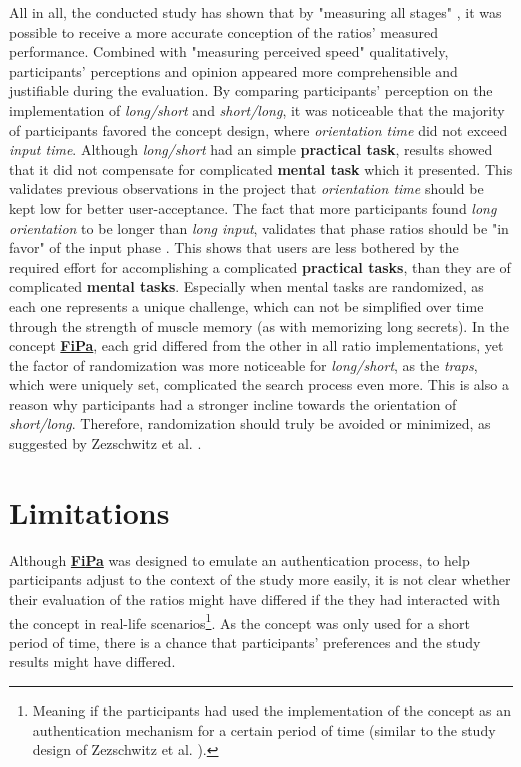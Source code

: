 All in all, the conducted study has shown that by "measuring all stages" \cite{Zezschwitz}, it was possible to receive a more accurate conception of the ratios' measured performance. Combined with "measuring perceived speed" \cite{Zezschwitz} qualitatively, participants' perceptions and opinion appeared more comprehensible and justifiable during the evaluation. By comparing participants' perception on the implementation of \textit{long/short} and \textit{short/long}, it was noticeable that the majority of participants favored the concept design, where \textit{orientation time} did not exceed \textit{input time}. Although \textit{long/short} had an simple \textbf{practical task}, results showed that it did not compensate for complicated \textbf{mental task} which it presented. This validates previous observations in the project that \textit{orientation time} should be kept low for better user-acceptance. The fact that more participants found \textit{long orientation} to be longer than \textit{long input}, validates that phase ratios should be "in favor" of the input phase . This shows that users are less bothered by the required effort for accomplishing a complicated \textbf{practical tasks}, than they are of complicated \textbf{mental tasks}. Especially when mental tasks are randomized, as each one represents a unique challenge, which can not be simplified over time through the strength of muscle memory (as with memorizing long secrets). In the concept \underline{\textbf{FiPa}}, each grid differed from the other in all ratio implementations, yet the factor of randomization was more noticeable for \textit{long/short}, as the \textit{traps}, which were uniquely set, complicated the search process even more. This is also a reason why participants had a stronger incline towards the orientation of \textit{short/long}. Therefore, randomization should truly be avoided or minimized, as suggested by Zezschwitz et al. \cite{Zezschwitz}. \\


\section{Limitations}

Although \underline{\textbf{FiPa}} was designed to emulate an authentication process, to help participants adjust to the context of the study more easily, it is not clear whether their evaluation of the ratios might have differed if the they had interacted with the concept in real-life scenarios\footnote{Meaning if the participants had used the implementation of the concept as an authentication mechanism for a certain period of time (similar to the study design of Zezschwitz et al. \cite{Zezschwitz}).}. As the concept was only used for a short period of time, there is a chance that participants' preferences and the study results might have differed.\\


